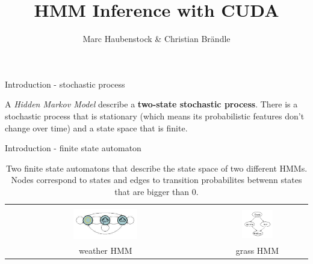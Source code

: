 \documentclass[11pt]{beamer}
\begin{document}
\begin{frame}
\title{HMM Inference with CUDA}
\subtitle{Marc Haubenstock \& Christian Brändle}

\titlepage
\end{frame}


\begin{frame}{Introduction - stochastic process}

A \emph{Hidden Markov Model} describe a \textbf{two-state stochastic process}.
There is a stochastic process that is stationary (which means its probabilistic features don't change over time) and a state space that is finite.

\end{frame}

\begin{frame}{Introduction - finite state automaton}
\begin{table}[h]
	\begin{center}
		\begin{tabular}{| c | c |}
			\hline
			& \\
			\includegraphics[width=0.33\textwidth]{./Images/FiniteStateAutomaton_1.png} & \includegraphics[width=0.33\textwidth]{./Images/FiniteStateAutomaton_2.png} \\
			\hline
			weather HMM \footfullcite{hmm_fb} & grass HMM \footfullcite{gm_bn} \\
			\hline
		\end{tabular}
	\end{center}
	\caption{Two finite state automatons that describe the state space of two different HMMs. Nodes correspond to states and edges to transition probabilites betwenn states that are bigger than $0$.}
	\label{tab:FiniteSA}
\end{table}


\end{frame}
\end{document}
